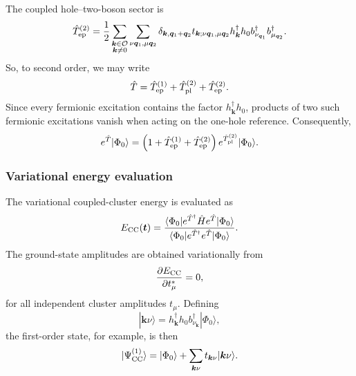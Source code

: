 The coupled hole--two-boson sector is
\begin{equation}
    {
    \hat{T}_{\rm ep}^{(2)}
    =
    \frac{1}{2}
    \sum_{\substack{\bm{k}\in\mathcal{O}\\ \bm{k}\neq0}}
    \sum_{\nu\bm{q}_1,\mu\bm{q}_2}
    \delta_{\bm{k},\bm{q}_1+\bm{q}_2}
    t_{\bm{k};\nu\bm{q}_1,\mu\bm{q}_2}
    h_{\bm{k}}^{\dagger}
    h_0
    b_{\nu_{\bm{q}_1}}^{\dagger}
    b_{\mu_{\bm{q}_2}}^{\dagger}.
    }
\end{equation}
So, to second order,
we may write
\begin{equation}
    \hat{T}
    =
    \hat{T}_{\rm ep}^{(1)}
    +
    \hat{T}_{\rm pl}^{(2)}
    +
    \hat{T}_{\rm ep}^{(2)}.
    \label{eq:T2}
\end{equation}
%
Since every fermionic excitation contains the factor
$h_{\bm{k}}^{\dagger}h_0$, products of two such fermionic excitations
vanish when acting on the one-hole reference. Consequently,
\begin{equation}
    e^{\hat{T}}|\Phi_0\rangle
    =
    \left(
    1
    +
    \hat{T}_{\rm ep}^{(1)}
    +
    \hat{T}_{\rm ep}^{(2)}
    \right)
    e^{\hat{T}_{\rm pl}^{(2)}}
    |\Phi_0\rangle.
    \label{eq:trunc}
\end{equation}
\subsubsection{Variational energy evaluation}
The variational coupled-cluster energy is evaluated as
\begin{equation}
    E_{\rm CC}(\bm{t})
    =
    \frac{
    \langle\Phi_0|
    e^{\hat{T}^{\dagger}}
    \hat{H}
    e^{\hat{T}}
    |\Phi_0\rangle
    }{
    \langle\Phi_0|
    e^{\hat{T}^{\dagger}}
    e^{\hat{T}}
    |\Phi_0\rangle
    }.
\end{equation}
The ground-state amplitudes are obtained variationally from
\begin{equation}
    {
    \frac{\partial E_{\rm CC}}{\partial t_{\mu}^{*}}=0,
    }
\end{equation}
for all independent cluster amplitudes $t_{\mu}$.
%
Defining
\begin{equation}
    |\bm{k}\nu\rangle
    =
    h_{\bm{k}}^{\dagger}
    h_0
    b_{\nu_{\bm{k}}}^{\dagger}
    |\Phi_0\rangle,
\end{equation}
the first-order state, for example, is then
\begin{equation}
    |\Psi_{\rm CC}^{(1)}\rangle
    =
    |\Phi_0\rangle
    +
    \sum_{\bm{k}\nu}
    t_{\bm{k}\nu}
    |\bm{k}\nu\rangle.
\end{equation}
